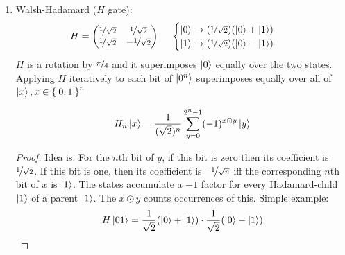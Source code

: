 \documentclass{article}
\begin{document}
\begin{enumerate}
    \item Walsh-Hadamard ($H$ gate):
    \begin{align}
        H = 
        \begin{pmatrix}
            \nicefrac{1}{\sqrt{2}} & \nicefrac{1}{\sqrt{2}} \\
            \nicefrac{1}{\sqrt{2}} & -\nicefrac{1}{\sqrt{2}}
        \end{pmatrix}
        \ \ \ \
        &
        \begin{cases}
            \ket{0} \to (\nicefrac{1}{\sqrt{2}})(\ket{0} + \ket{1}) \\
            \ket{1} \to (\nicefrac{1}{\sqrt{2}})(\ket{0} - \ket{1}) \\
        \end{cases}
    \end{align}
    $H$ is a rotation by $\nicefrac{\pi}{4}$ and it superimposes $\ket{0}$ equally over the two states. Applying $H$ iteratively to each bit of $\ket{0^n}$ superimposes equally over all of $\ket{x}, x \in \Set{0, 1}^n$ 
    \begin{prop}
    \begin{equation}
    H_n \ket{x} = \frac{1}{(\sqrt{2})^n} \sum_{y=0}^{2^n - 1} (-1)^{x \odot y} \ket{y}
    \end{equation}
    \end{prop}
    \begin{proof}
    Idea is: For the $n$th bit of $y$, if this bit is zero then its coefficient is $\nicefrac{1}{\sqrt{2}}$. If this bit is one, then its coefficient is $\nicefrac{-1}{\sqrt{n}}$ iff the corresponding $n$th bit of $x$ is $\ket{1}$. The states accumulate a $-1$ factor for every Hadamard-child $\ket{1}$ of a parent $\ket{1}$. The $x\odot y$ counts occurrences of this. Simple example:
    \begin{equation}
        H \ket{01} = \frac{1}{\sqrt{2}} ( \ket{0} + \ket{1} )  \cdot \frac{1}{\sqrt{2}} ( \ket{0} - \ket{1} ) 
    \end{equation}
    \end{proof}
    
\end{enumerate}
\end{document}

